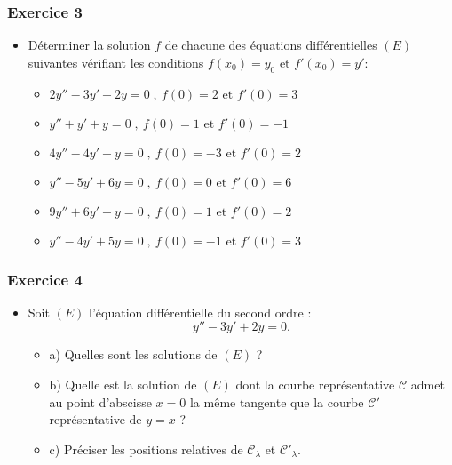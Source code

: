 \documentclass[12pt]{article}
\begin{document}
\subsubsection*{Exercice 3}
\begin{itemize}
    \item Déterminer la solution \(f\) de chacune des équations différentielles \((E)\) suivantes vérifiant les conditions \(f(x_{0})=y_{0}\text{ et }f'(x_{0})=y'\):
    \begin{itemize}
        \item \(2y''-3y'-2y=0\;,\ f(0)=2\text{ et }f'(0)=3\)
        \item \(y''+y'+y=0\;,\ f(0)=1\text{ et }f'(0)=-1\)
        \item \(4y''-4y'+y=0\;,\ f(0)=-3\text{ et }f'(0)=2\)
        \item \(y''-5y'+6y=0\;,\ f(0)=0\text{ et }f'(0)=6\)
        \item \(9y''+6y'+y=0\;,\ f(0)=1\text{ et }f'(0)=2\)
        \item \(y''-4y'+5y=0\;,\ f(0)=-1\text{ et }f'(0)=3\)
    \end{itemize}
\end{itemize}
\subsubsection*{Exercice 4}
\begin{itemize}
    \item Soit \((E)\) l'équation différentielle du second ordre :
    \[y''-3y'+2y=0.\]
    \begin{itemize}
        \item a) Quelles sont les solutions de \((E)\) ?
        \item b) Quelle est la solution de \((E)\) dont la courbe représentative \(\mathcal{C}\) admet au point d'abscisse \(x=0\) la même tangente que la courbe \(\mathcal{C'}\) représentative de \(y=x\) ?
        \item c) Préciser les positions relatives de \(\mathcal{C}_{\lambda}\) et \(\mathcal{C'}_{\lambda}.\)
    \end{itemize}
\end{itemize}
\end{document}
